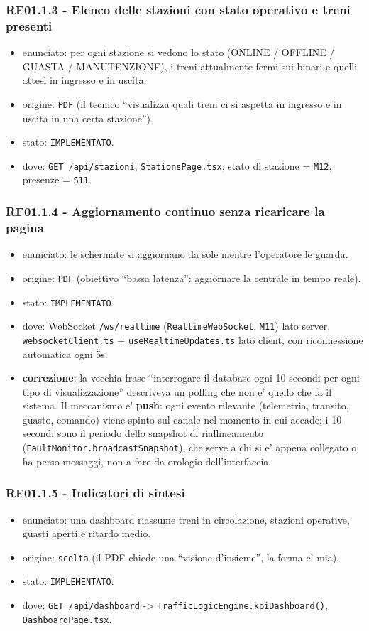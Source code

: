\documentclass[11pt]{article}
\begin{document}
\subsubsection{RF01.1.3 - Elenco delle stazioni con stato operativo e treni presenti}
\label{sec:org02f6b5a}
\begin{itemize}
\item enunciato: per ogni stazione si vedono lo stato (ONLINE / OFFLINE / GUASTA / MANUTENZIONE), i
treni attualmente fermi sui binari e quelli attesi in ingresso e in uscita.
\item origine: \texttt{PDF} (il tecnico ``visualizza quali treni ci si aspetta in ingresso e in uscita in una
certa stazione'').
\item stato: \texttt{IMPLEMENTATO}.
\item dove: \texttt{GET /api/stazioni}, \texttt{StationsPage.tsx}; stato di stazione = \texttt{M12}, presenze = \texttt{S11}.
\end{itemize}
\subsubsection{RF01.1.4 - Aggiornamento continuo senza ricaricare la pagina}
\label{sec:orgfe362ec}
\begin{itemize}
\item enunciato: le schermate si aggiornano da sole mentre l'operatore le guarda.
\item origine: \texttt{PDF} (obiettivo ``bassa latenza'': aggiornare la centrale in tempo reale).
\item stato: \texttt{IMPLEMENTATO}.
\item dove: WebSocket \texttt{/ws/realtime} (\texttt{RealtimeWebSocket}, \texttt{M11}) lato server, \texttt{websocketClient.ts} +
\texttt{useRealtimeUpdates.ts} lato client, con riconnessione automatica ogni 5s.
\item \textbf{correzione}: la vecchia frase ``interrogare il database ogni 10 secondi per ogni tipo di
visualizzazione'' descriveva un polling che non e' quello che fa il sistema. Il meccanismo e'
\textbf{push}: ogni evento rilevante (telemetria, transito, guasto, comando) viene spinto sul canale nel
momento in cui accade; i 10 secondi sono il periodo dello snapshot di riallineamento
(\texttt{FaultMonitor.broadcastSnapshot}), che serve a chi si e' appena collegato o ha perso messaggi,
non a fare da orologio dell'interfaccia.
\end{itemize}
\subsubsection{RF01.1.5 - Indicatori di sintesi}
\label{sec:org85deab7}
\begin{itemize}
\item enunciato: una dashboard riassume treni in circolazione, stazioni operative, guasti aperti e
ritardo medio.
\item origine: \texttt{scelta} (il PDF chiede una ``visione d'insieme'', la forma e' mia).
\item stato: \texttt{IMPLEMENTATO}.
\item dove: \texttt{GET /api/dashboard} -> \texttt{TrafficLogicEngine.kpiDashboard()}, \texttt{DashboardPage.tsx}.
\end{itemize}
\end{document}
